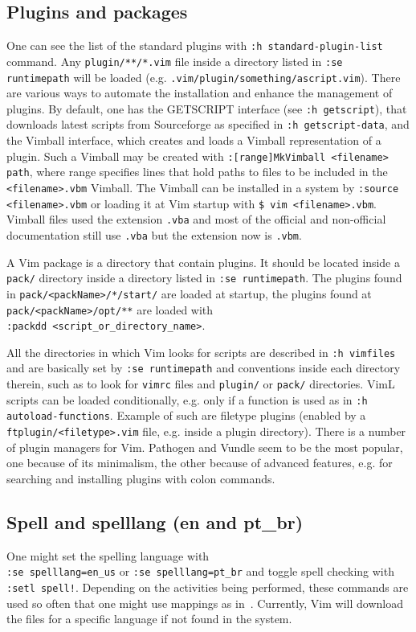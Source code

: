 \documentclass{article}
\newcommand{\tttt}[1]{\texttt{#1}}
\begin{document}
\subsection{Plugins and packages}
One can see the list of the standard plugins
with \tttt{:h standard-plugin-list} command.
Any \tttt{plugin/**/*.vim} file inside a directory
listed in \tttt{:se runtimepath} will be loaded
(e.g. \tttt{.vim/plugin/something/ascript.vim}).
There are various ways to automate the installation
and enhance the management of plugins.
By default, one has the GETSCRIPT interface (see \tttt{:h getscript}),
that downloads latest scripts from Sourceforge as specified in \tttt{:h getscript-data},
and the Vimball interface, which creates and loads a Vimball representation of a
plugin.
Such a Vimball may be created with \tttt{:[range]MkVimball <filename> path}, where range specifies lines
that hold paths to files to be included in the \tttt{<filename>.vbm} Vimball.
The Vimball can be installed in a system by \tttt{:source <filename>.vbm}
or loading it at Vim startup with \tttt{\$ vim <filename>.vbm}.
Vimball files used the extension \tttt{.vba} and most of the official and
non-official documentation still use \tttt{.vba} but the extension now
is \tttt{.vbm}.

A Vim package is a directory that contain plugins.
It should be located inside a \tttt{pack/} directory
inside a directory listed in \tttt{:se runtimepath}.
The plugins found in \tttt{pack/<packName>/*/start/} are loaded
at startup, the plugins found at
\tttt{pack/<packName>/opt/**} are loaded with\\
\tttt{:packdd <script\_or\_directory\_name>}.

All the directories in which Vim looks for scripts are described
in \tttt{:h vimfiles} and are basically set by
\tttt{:se runtimepath} and conventions inside
each directory therein, such as to look for \tttt{vimrc} files
and \tttt{plugin/} or \tttt{pack/} directories.
VimL scripts can be loaded conditionally,
e.g. only if a function is used as in \tttt{:h autoload-functions}.
Example of such are filetype plugins (enabled by a \tttt{ftplugin/<filetype>.vim} file,
e.g. inside a plugin directory).
There is a number of plugin managers for Vim.
Pathogen and Vundle seem to be the most popular,
one because of its minimalism, the other because of
advanced features, e.g. for searching and installing plugins with
colon commands.

\subsection{Spell and spelllang (en and pt\_br)}
One might set the spelling language with\\ \tttt{:se spelllang=en\_us}
or \tttt{:se spelllang=pt\_br}
and toggle spell checking with \tttt{:setl spell!}.
Depending on the activities being performed,
these commands are used so often that one might use mappings as in~\cite{vimrc}.
Currently, Vim will download the files for a specific language if
not found in the system.
\end{document}
